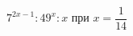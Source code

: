 \begin{ex}
	\begin{condition}
		\( 7^{2x-1}:49^x:x \) при \( x=\dfrac{1}{14} \)
	\end{condition}
\end{ex}